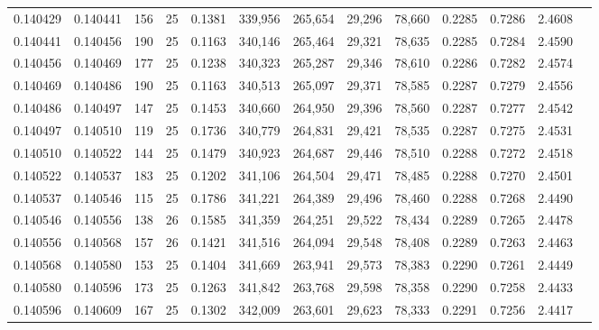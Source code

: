 \begin{tabular}{rrrrrrrrrrrrr}
0.140429 & 0.140441 &   156 &  25 &                                     0.1381 & 339,956 & 265,654 &  29,296 &  78,660 & 0.2285 & 0.7286 & 2.4608 \\
0.140441 & 0.140456 &   190 &  25 &                                     0.1163 & 340,146 & 265,464 &  29,321 &  78,635 & 0.2285 & 0.7284 & 2.4590 \\
0.140456 & 0.140469 &   177 &  25 &                                     0.1238 & 340,323 & 265,287 &  29,346 &  78,610 & 0.2286 & 0.7282 & 2.4574 \\
0.140469 & 0.140486 &   190 &  25 &                                     0.1163 & 340,513 & 265,097 &  29,371 &  78,585 & 0.2287 & 0.7279 & 2.4556 \\
0.140486 & 0.140497 &   147 &  25 &                                     0.1453 & 340,660 & 264,950 &  29,396 &  78,560 & 0.2287 & 0.7277 & 2.4542 \\
0.140497 & 0.140510 &   119 &  25 &                                     0.1736 & 340,779 & 264,831 &  29,421 &  78,535 & 0.2287 & 0.7275 & 2.4531 \\
0.140510 & 0.140522 &   144 &  25 &                                     0.1479 & 340,923 & 264,687 &  29,446 &  78,510 & 0.2288 & 0.7272 & 2.4518 \\
0.140522 & 0.140537 &   183 &  25 &                                     0.1202 & 341,106 & 264,504 &  29,471 &  78,485 & 0.2288 & 0.7270 & 2.4501 \\
0.140537 & 0.140546 &   115 &  25 &                                     0.1786 & 341,221 & 264,389 &  29,496 &  78,460 & 0.2288 & 0.7268 & 2.4490 \\
0.140546 & 0.140556 &   138 &  26 &                                     0.1585 & 341,359 & 264,251 &  29,522 &  78,434 & 0.2289 & 0.7265 & 2.4478 \\
0.140556 & 0.140568 &   157 &  26 &                                     0.1421 & 341,516 & 264,094 &  29,548 &  78,408 & 0.2289 & 0.7263 & 2.4463 \\
0.140568 & 0.140580 &   153 &  25 &                                     0.1404 & 341,669 & 263,941 &  29,573 &  78,383 & 0.2290 & 0.7261 & 2.4449 \\
0.140580 & 0.140596 &   173 &  25 &                                     0.1263 & 341,842 & 263,768 &  29,598 &  78,358 & 0.2290 & 0.7258 & 2.4433 \\
0.140596 & 0.140609 &   167 &  25 &                                     0.1302 & 342,009 & 263,601 &  29,623 &  78,333 & 0.2291 & 0.7256 & 2.4417 \\

\end{tabular}
